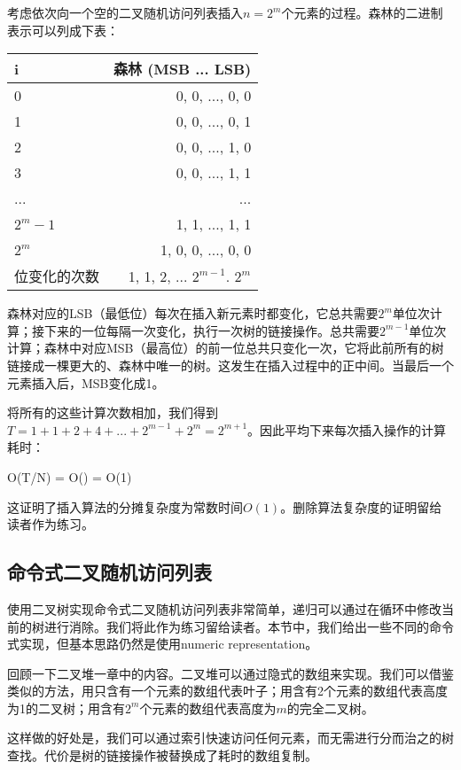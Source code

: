 \documentclass[UTF8]{article}
\begin{document}
考虑依次向一个空的二叉随机访问列表插入$n = 2^m$个元素的过程。森林的二进制表示可以列成下表：

\begin{tabular}{l | r}
  \hline
  i & 森林 (MSB ... LSB) \\
  \hline
  0 & 0, 0, ..., 0, 0 \\
  1 & 0, 0, ..., 0, 1 \\
  2 & 0, 0, ..., 1, 0 \\
  3 & 0, 0, ..., 1, 1 \\
  ... & ... \\
  $2^m-1$ & 1, 1, ..., 1, 1 \\
  $2^m$ & 1, 0, 0, ..., 0, 0 \\
  \hline
  位变化的次数 & 1, 1, 2, ... $2^{m-1}$. $2^m$ \\
  \hline
\end{tabular}

森林对应的LSB（最低位）每次在插入新元素时都变化，它总共需要$2^m$单位次计算；接下来的一位每隔一次变化，执行一次树的链接操作。总共需要$2^{m-1}$单位次计算；森林中对应MSB（最高位）的前一位总共只变化一次，它将此前所有的树链接成一棵更大的、森林中唯一的树。这发生在插入过程中的正中间。当最后一个元素插入后，MSB变化成1。

将所有的这些计算次数相加，我们得到$T = 1 + 1 + 2 + 4 + ... + 2^{m-1} + 2^m = 2^{m+1}$。因此平均下来每次插入操作的计算耗时：

\be
O(T/N) = O() = O(1)
\ee

这证明了插入算法的分摊复杂度为常数时间$O(1)$。删除算法复杂度的证明留给读者作为练习。

\subsection{命令式二叉随机访问列表}

使用二叉树实现命令式二叉随机访问列表非常简单，递归可以通过在循环中修改当前的树进行消除。我们将此作为练习留给读者。本节中，我们给出一些不同的命令式实现，但基本思路仍然是使用numeric representation。

回顾一下二叉堆一章中的内容。二叉堆可以通过隐式的数组来实现。我们可以借鉴类似的方法，用只含有一个元素的数组代表叶子；用含有2个元素的数组代表高度为1的二叉树；用含有$2^m$个元素的数组代表高度为$m$的完全二叉树。

这样做的好处是，我们可以通过索引快速访问任何元素，而无需进行分而治之的树查找。代价是树的链接操作被替换成了耗时的数组复制。
\end{document}
